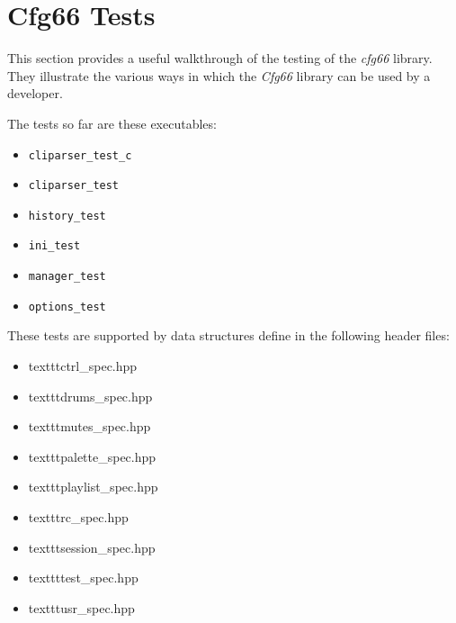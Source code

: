 %
%
%

\section{Cfg66 Tests}
\label{sec:cfg66_tests}

   This section provides a useful walkthrough of the testing
   of the \textsl{cfg66} library.
   They illustrate the various ways in which the \textsl{Cfg66} library
   can be used by a developer.

   The tests so far are these executables:

    \begin{itemize}
        \item \texttt{cliparser\_test\_c}
        \item \texttt{cliparser\_test}
        \item \texttt{history\_test}
        \item \texttt{ini\_test}
        \item \texttt{manager\_test}
        \item \texttt{options\_test}
    \end{itemize}

    These tests are supported by data structures define in the following
    header files:

    \begin{itemize}
        \item texttt{ctrl\_spec.hpp}
        \item texttt{drums\_spec.hpp}
        \item texttt{mutes\_spec.hpp}
        \item texttt{palette\_spec.hpp}
        \item texttt{playlist\_spec.hpp}
        \item texttt{rc\_spec.hpp}
        \item texttt{session\_spec.hpp}
        \item texttt{test\_spec.hpp}
        \item texttt{usr\_spec.hpp}
    \end{itemize}

